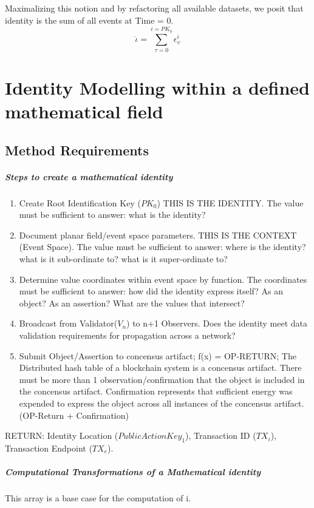 \documentclass{article}
\begin{document}
Maximalizing this notion and by refactoring all available datasets, we posit that identity is the sum of all events at Time = 0.\\

	\begin{equation}
		\dot \iota = \sum_{\tau=0}^{i=PK_0} \epsilon^i_\upsilon
	\end{equation}
 		


\section{Identity Modelling within a defined mathematical field}
	\subsection{Method Requirements}
			\subparagraph{Steps to create a mathematical identity}
			\begin{enumerate}
				\item Create Root Identification Key ($PK_0$)  THIS IS THE IDENTITY.  The value must be sufficient to answer: what is the identity?
				\item Document planar field/event space parameters.  THIS IS THE CONTEXT (Event Space).  The value must be sufficient to answer: where is the identity? what is it sub-ordinate to? what is it super-ordinate to?
				\item Determine value coordinates within event space by function. The coordinates must be sufficient to answer: how did the identity express itself?  As an object? As an assertion? What are the values that intersect?
				\item Broadcast from Validator($V_n$) to n+1 Observers.  Does the identity meet data validation requirements for propagation across a network?
				\item Submit Object/Assertion to concensus artifact;  f(x) = OP-RETURN;  The Distributed hash table of a blockchain system is a concensus artifact.  There must be more than 1 observation/confirmation that the object is included in the concensus artifact. Confirmation represents that sufficient energy was expended to express the object across all instances of the concensus artifact. (OP-Return + Confirmation)  
			\end{enumerate}			
			RETURN:  Identity Location ($PublicActionKey_1$),  Transaction ID ($TX_i$), Transaction Endpoint ($TX_e$).
			\subparagraph{Computational Transformations of a Mathematical identity}
				This array is a base case for the computation of i. \\
\end{document}
